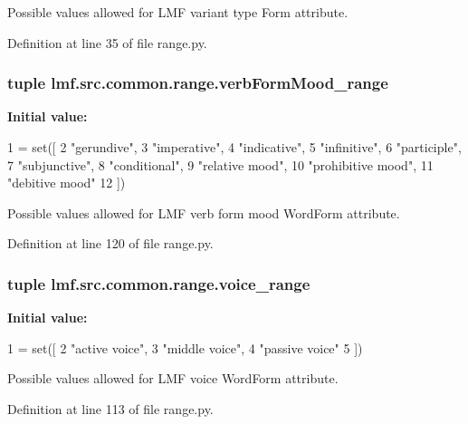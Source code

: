 Possible values allowed for L\+M\+F variant type Form attribute. 



Definition at line 35 of file range.\+py.

\hypertarget{namespacelmf_1_1src_1_1common_1_1range_a5a57dc7ed7fa1f785e812cfe2c306ef6}{
\subsubsection[{verb\+Form\+Mood\+\_\+range}]{\setlength{\rightskip}{0pt plus 5cm}tuple lmf.\+src.\+common.\+range.\+verb\+Form\+Mood\+\_\+range}}\label{namespacelmf_1_1src_1_1common_1_1range_a5a57dc7ed7fa1f785e812cfe2c306ef6}
{\bfseries Initial value\+:}
\begin{DoxyCode}
1 = set([
2     \textcolor{stringliteral}{"gerundive"},
3     \textcolor{stringliteral}{"imperative"},
4     \textcolor{stringliteral}{"indicative"},
5     \textcolor{stringliteral}{"infinitive"},
6     \textcolor{stringliteral}{"participle"},
7     \textcolor{stringliteral}{"subjunctive"},
8     \textcolor{stringliteral}{"conditional"},
9     \textcolor{stringliteral}{"relative mood"},
10     \textcolor{stringliteral}{"prohibitive mood"},
11     \textcolor{stringliteral}{"debitive mood"}
12 ])
\end{DoxyCode}


Possible values allowed for L\+M\+F verb form mood Word\+Form attribute. 



Definition at line 120 of file range.\+py.

\hypertarget{namespacelmf_1_1src_1_1common_1_1range_a23fdc4c034bc34cab81c6b9c051074dd}{
\subsubsection[{voice\+\_\+range}]{\setlength{\rightskip}{0pt plus 5cm}tuple lmf.\+src.\+common.\+range.\+voice\+\_\+range}}\label{namespacelmf_1_1src_1_1common_1_1range_a23fdc4c034bc34cab81c6b9c051074dd}
{\bfseries Initial value\+:}
\begin{DoxyCode}
1 = set([
2     \textcolor{stringliteral}{"active voice"},
3     \textcolor{stringliteral}{"middle voice"},
4     \textcolor{stringliteral}{"passive voice"}
5 ])
\end{DoxyCode}


Possible values allowed for L\+M\+F voice Word\+Form attribute. 



Definition at line 113 of file range.\+py.

